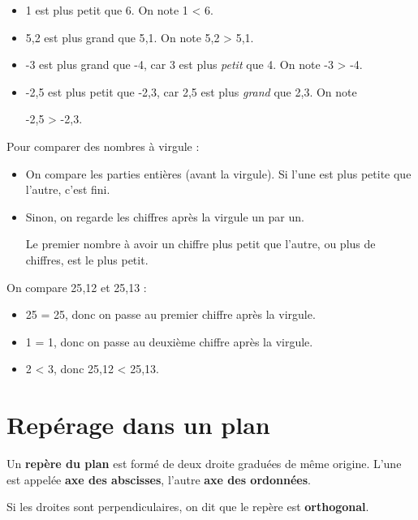\documentclass[a4paper,11pt]{article}
\begin{document}
\begin{exemple}
	\begin{itemize}
		\item 1 est plus petit que 6. On note 1 < 6.
		\item 5{,}2 est plus grand que 5{,}1. On note 5{,}2 > 5{,}1.
		\item -3 est plus grand que -4, car 3 est plus \textit{petit} que 4. On note -3 > -4.
		\item -2{,}5 est plus petit que -2{,}3, car 2{,}5 est plus \textit{grand} que 2{,}3. On note

		      -2{,}5 > -2{,}3.
	\end{itemize}
\end{exemple}

\begin{greybox}[frametitle={Rappel : comparer des nombres à virgules}]
	Pour comparer des nombres à virgule :
	\begin{itemize}
		\item On compare les parties entières (avant la virgule). Si l'une est plus petite que l'autre, c'est fini.
		\item Sinon, on regarde les chiffres après la virgule un par un.

		      Le premier nombre à avoir un chiffre plus petit que l'autre, ou plus de chiffres, est le plus petit.
	\end{itemize}

	\begin{exemple}
		On compare 25{,}12 et 25{,}13 :

		\begin{itemize}
			\item 25 = 25, donc on passe au premier chiffre après la virgule.
			\item 1 = 1, donc on passe au deuxième chiffre après la virgule.
			\item 2 < 3, donc 25{,}12 < 25{,}13.
		\end{itemize}
	\end{exemple}
\end{greybox}

\section{Repérage dans un plan}

\begin{cours}
	Un \textbf{repère du plan} est formé de deux droite graduées de même origine. L'une est appelée \textbf{\color{red} axe des abscisses}, l'autre \textbf{\color{blue} axe des ordonnées}.

	Si les droites sont perpendiculaires, on dit que le repère est \textbf{orthogonal}.
\end{cours}
\end{document}

